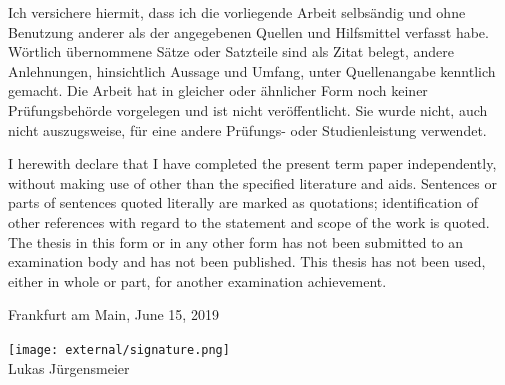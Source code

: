 \documentclass[12pt,a4paper]{article}
\begin{document}
Ich versichere hiermit, dass ich die vorliegende Arbeit selbs\"andig und ohne Benutzung anderer als der angegebenen Quellen und Hilfsmittel verfasst habe. W\"ortlich \"ubernommene S\"atze oder Satzteile sind als Zitat belegt, andere Anlehnungen, hinsichtlich Aussage und Umfang, unter Quellenangabe kenntlich gemacht. Die Arbeit hat in gleicher oder \"ahnlicher Form noch keiner Pr\"ufungsbeh\"orde vorgelegen und ist nicht ver\"offentlicht. Sie wurde nicht, auch nicht auszugsweise, f\"ur eine andere Pr\"ufungs- oder Studienleistung verwendet.


I herewith declare that I have completed the present term paper independently, without making use of
other than the specified literature and aids. Sentences or parts of sentences quoted literally are
marked as quotations; identification of other references with regard to the statement and scope of
the work is quoted. The thesis in this form or in any other form has not been submitted to an examination body and has not been published.
This thesis has not been used, either in whole or part, for another examination achievement.

\vspace{1cm}

Frankfurt am Main, June 15, 2019

\texttt{[image: external/signature.png]}\\
Lukas J\"urgensmeier
\end{document}
